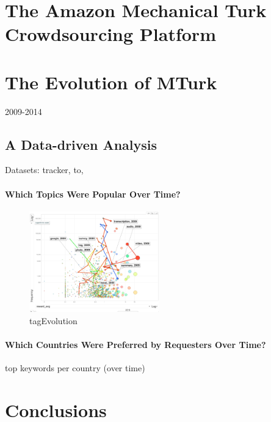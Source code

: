 \documentclass{sig-alternate}
\begin{document}






\section{The Amazon Mechanical Turk Crowdsourcing Platform}

\section{The Evolution of MTurk}
2009-2014
\subsection{A Data-driven Analysis}
Datasets: tracker, to, 
\paragraph{Which Topics Were Popular Over Time?}

\begin{figure}[htbp]
	\centering
		\includegraphics[width=0.5\textwidth]{tagEvolution.png}
	\caption{tagEvolution}
	\label{fig:tagEvolution}
\end{figure}

\paragraph{Which Countries Were Preferred by Requesters Over Time?}
top keywords per country (over time)





\section{Conclusions}



\end{document}
